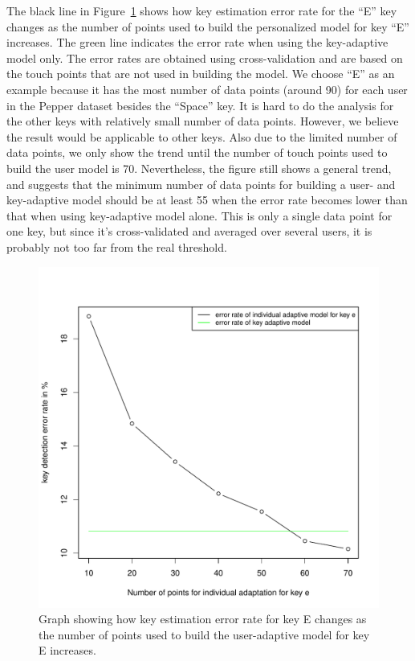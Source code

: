\documentclass{sigchi}
\begin{document}
The black line in Figure~\ref{fig:user-adapt} shows how key estimation error rate for the ``E'' key
changes as the number of points used to build
the personalized model for key ``E'' increases. The green line indicates the
error rate when using the key-adaptive model only. The error rates are obtained using cross-validation and are based on the touch points that are not used in building the
model. We choose ``E'' as an
example because it has the most number of data points (around 90) for each
user in the Pepper dataset besides the ``Space'' key. It is hard to do the
analysis for the other keys with relatively small number of data points. However, we believe the result would be applicable to other
keys. Also due to the limited number
of data points, we only show the trend until the number of touch points used to build the user
model is 70. Nevertheless, the figure still shows a general trend, and suggests 
that the minimum number of data points for building a user- and key-adaptive model
should be at least 55 when the error rate becomes lower than that when using key-adaptive model alone. This is only a single data point for one key, but since it's cross-validated and averaged over several users, it is probably not too far from the real threshold.

\begin{figure}[tb]
  \centering
  \includegraphics[width=0.9\columnwidth]{figures/individual-adapt.pdf}
  \caption{Graph showing how key estimation error rate for key E changes as the number of
  points used to build the user-adaptive model for key E increases.}
  \label{fig:user-adapt}
\end{figure}
\end{document}
